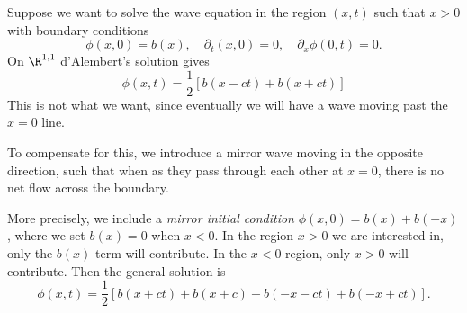 \documentclass[a4paper]{article}
\begin{document}
\begin{eg}
  Suppose we want to solve the wave equation in the region $(x, t)$ such that $x > 0$ with boundary conditions
  \[
    \phi(x, 0) = b(x),\quad \partial_t(x, 0) = 0,\quad \partial_x \phi(0, t) = 0.
  \]
  On $\R^{1, 1}$ d'Alembert's solution gives
  \[
    \phi(x, t) = \frac{1}{2}[b(x - ct) + b(x + ct)]
  \]
  This is not what we want, since eventually we will have a wave moving past the $x = 0$ line.
  \begin{center}
  \end{center}
  To compensate for this, we introduce a mirror wave moving in the opposite direction, such that when as they pass through each other at $x = 0$, there is no net flow across the boundary.
  \begin{center}
  \end{center}
  More precisely, we include a \emph{mirror initial condition} $\phi(x, 0) = b(x) + b(-x)$, where we set $b(x) = 0$ when $x < 0$. In the region $x > 0$ we are interested in, only the $b(x)$ term will contribute. In the $x < 0$ region, only $x > 0$ will contribute. Then the general solution is
  \[
    \phi(x, t) = \frac{1}{2}[b(x + ct) + b(x + c) + b( -x - ct) + b(-x + ct)].
  \]
\end{eg}
\end{document}
